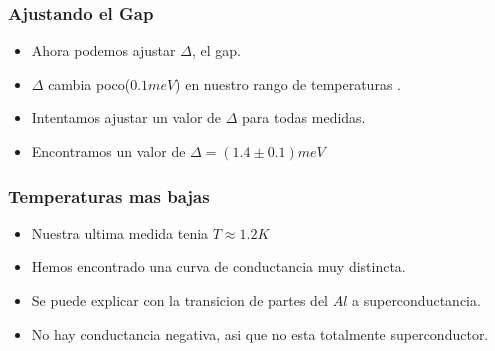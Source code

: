 

\frame
{
  \frametitle{Ajustando el Gap}
  
      \begin{itemize}
     \item<1-> Ahora podemos ajustar $\Delta$, el gap.
     \item<2->  $\Delta$ cambia poco($0.1 meV$) en nuestro rango de temperaturas .
     \item<3-> Intentamos ajustar un valor de  $\Delta$ para todas medidas.
     \item<4-> Encontramos un valor de $\Delta = (1.4 \pm 0.1) meV$
     \end{itemize}
}



\frame
{
  \frametitle{Temperaturas mas bajas}
     \begin{itemize}
      \item<1-> Nuestra ultima medida tenia $T\approx 1.2K$
      \item<2-> Hemos encontrado una curva de conductancia muy distincta.
      \item<3-> Se puede explicar con la transicion de partes del $Al$ a superconductancia.
      \item<4-> No hay conductancia negativa, asi que no esta totalmente superconductor.
     \end{itemize}
  
}